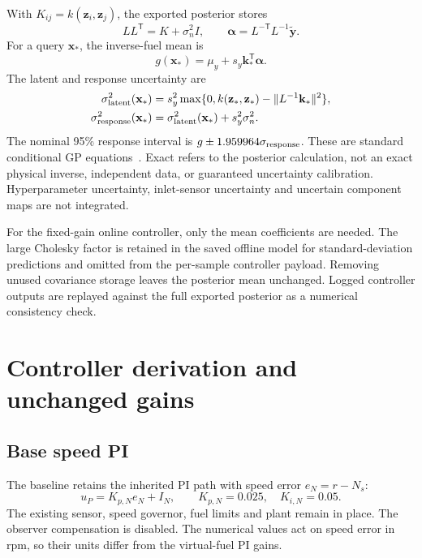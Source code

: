 With $K_{ij}=k(\mathbf z_i,\mathbf z_j)$, the exported posterior stores
\begin{equation}
LL^{\mathsf T}=K+\sigma_n^2I,\qquad
\boldsymbol\alpha=L^{-\mathsf T}L^{-1}\tilde{\mathbf y}.
\end{equation}
For a query $\mathbf x_*$, the inverse-fuel mean is
\begin{equation}
g(\mathbf x_*)=\mu_y+s_y\mathbf k_*^{\mathsf T}\boldsymbol\alpha.
\end{equation}
The latent and response uncertainty are
\begin{align}
\sigma_{\rm latent}^2(\mathbf x_*)&=s_y^2\max\{0,k(\mathbf z_*,\mathbf z_*)-\|L^{-1}\mathbf k_*\|^2\},\\
\sigma_{\rm response}^2(\mathbf x_*)&=\sigma_{\rm latent}^2(\mathbf x_*)+s_y^2\sigma_n^2.
\end{align}
The nominal 95\% response interval is $g\pm1.959964\sigma_{\rm response}$. These are standard conditional GP equations~\cite{gpml}. Exact refers to the posterior calculation, not an exact physical inverse, independent data, or guaranteed uncertainty calibration. Hyperparameter uncertainty, inlet-sensor uncertainty and uncertain component maps are not integrated.

For the fixed-gain online controller, only the mean coefficients are needed. The large Cholesky factor is retained in the saved offline model for standard-deviation predictions and omitted from the per-sample controller payload. Removing unused covariance storage leaves the posterior mean unchanged. Logged controller outputs are replayed against the full exported posterior as a numerical consistency check.

\clearpage
\section{Controller derivation and unchanged gains}
\subsection{Base speed PI}
The baseline retains the inherited PI path with speed error $e_N=r-N_s$:
\begin{equation}
u_P=K_{p,N}e_N+I_N,\qquad K_{p,N}=0.025,\quad K_{i,N}=0.05.
\end{equation}
The existing sensor, speed governor, fuel limits and plant remain in place. The observer compensation is disabled. The numerical values act on speed error in rpm, so their units differ from the virtual-fuel PI gains.

